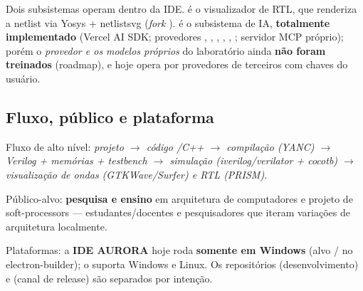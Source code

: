 Dois subsistemas operam dentro da IDE.  é o visualizador de RTL, que
renderiza a netlist via Yosys + netlistsvg (\emph{fork} ).
 é o subsistema de IA, \textbf{totalmente
implementado} (Vercel AI SDK; provedores , ,
, , , ; servidor MCP próprio);
porém o \emph{provedor e os modelos próprios} do laboratório ainda \textbf{não
foram treinados} (roadmap), e hoje opera por provedores de terceiros com chaves
do usuário.

\subsection{Fluxo, público e plataforma}

Fluxo de alto nível: \emph{projeto  $\to$ código \cmm{}/C++ $\to$
compilação (YANC) $\to$ Verilog + memórias + \emph{testbench} $\to$ simulação
(iverilog/verilator + cocotb) $\to$ visualização de ondas (GTKWave/Surfer) e RTL
(PRISM)}.

Público-alvo: \textbf{pesquisa e ensino} em arquitetura de computadores e projeto
de soft-processors --- estudantes/docentes e pesquisadores que iteram variações
de arquitetura localmente.

Plataformas: a \textbf{IDE AURORA} hoje roda \textbf{somente em Windows} (alvo
/ no electron-builder); o  suporta Windows e
Linux. Os repositórios  (desenvolvimento) e  (canal de
release) são separados por intenção.
